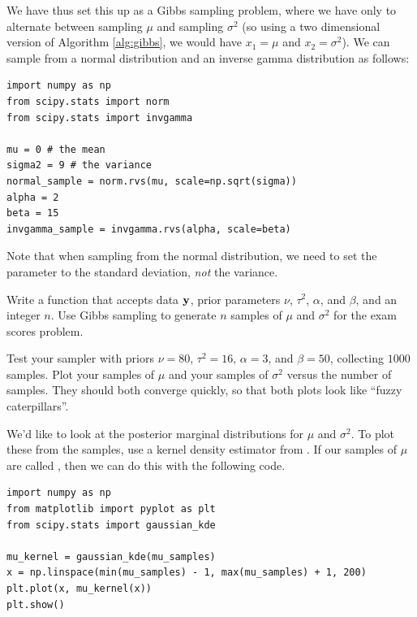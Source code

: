 We have thus set this up as a Gibbs sampling problem, where we have only to alternate between sampling $\mu$ and sampling $\sigma^{2}$ (so using a two dimensional version of Algorithm \ref{alg:gibbs}, we would have $x_1 = \mu$ and $x_2 = \sigma^2$).
We can sample from a normal distribution and an inverse gamma distribution as follows:
\begin{lstlisting}
import numpy as np
from scipy.stats import norm
from scipy.stats import invgamma

mu = 0 # the mean
sigma2 = 9 # the variance
normal_sample = norm.rvs(mu, scale=np.sqrt(sigma))
alpha = 2
beta = 15
invgamma_sample = invgamma.rvs(alpha, scale=beta)
\end{lstlisting}
Note that when sampling from the normal distribution, we need to set the  parameter to the standard deviation, \emph{not} the variance.

\begin{problem}
Write a function that accepts data $\mathbf{y}$, prior parameters $\nu$, $\tau^2$, $\alpha$, and $\beta$, and an integer $n$.
Use Gibbs sampling to generate $n$ samples of $\mu$ and $\sigma^2$ for the exam scores problem.

Test your sampler with priors $\nu=80$, $\tau^{2} = 16$, $\alpha = 3$, and $\beta = 50$, collecting $1000$ samples.
Plot your samples of $\mu$ and your samples of $\sigma^{2}$ versus the number of samples.
They should both converge quickly, so that both plots look like ``fuzzy caterpillars''.
\end{problem}

We'd like to look at the posterior marginal distributions for $\mu$ and $\sigma^2$.
To plot these from the samples, use a kernel density estimator from .
If our samples of $\mu$ are called , then we can do this with the following code.
\begin{lstlisting}
import numpy as np
from matplotlib import pyplot as plt
from scipy.stats import gaussian_kde

mu_kernel = gaussian_kde(mu_samples)
x = np.linspace(min(mu_samples) - 1, max(mu_samples) + 1, 200)
plt.plot(x, mu_kernel(x))
plt.show()
\end{lstlisting}

